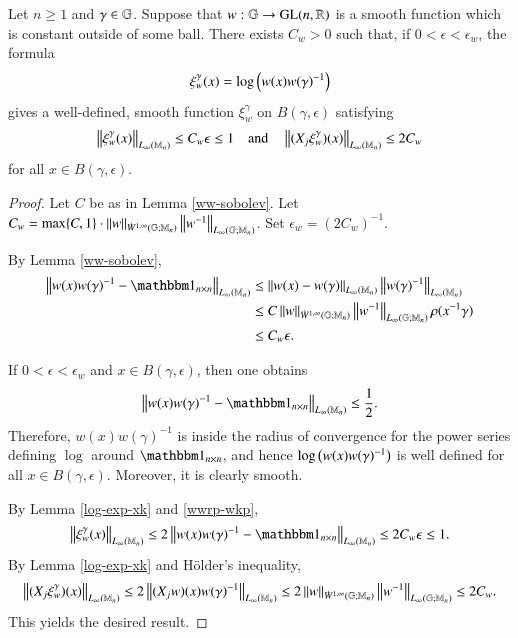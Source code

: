 \documentclass[leqno]{amsart}
\begin{document}
	
	
	
	
	\begin{lemma}\label{approximation-inner}
		Let $n\geq1$ and $\gamma\in\mathbb{G}$. Suppose that $w:\mathbb{G}\rightarrow{\rm GL}(n,\mathbb{R})$ is a smooth function which is constant outside of some ball. 		There exists $C_{w}>0$ such that, if $0<\epsilon<\epsilon_w$, the formula
		\begin{align*}
			\xi^{\gamma}_{w}(x)=\log\Big(w(x)w(\gamma)^{-1}\Big)
		\end{align*}
		gives a well-defined, smooth function $\xi^{\gamma}_{w}$ on $B(\gamma,\epsilon)$ satisfying
		\begin{align*}
			\left\| \xi^{\gamma}_{w}(x) \right\|_{L_{\infty}(\mathbb{M}_{n})}\leq C_{w}\epsilon\leq 1
			\quad\text{and}\quad
			\left\| (X_{j}\xi^{\gamma}_{w})(x) \right\|_{L_{\infty}(\mathbb{M}_{n})}\leq 2C_{w}
		\end{align*}
		for all $x\in B(\gamma, \epsilon)$.
	\end{lemma}
	\begin{proof} Let $C$ be as in Lemma \ref{ww-sobolev}. Let $C_{w}=\max\{C,1\}\cdot \left\| w \right\|_{\dot{W}^{1,\infty}(\mathbb{G};\mathbb{M}_{n})}\left\| w^{-1} \right\|_{L_{\infty}(\mathbb{G};\mathbb{M}_{n})}$. Set $\epsilon_w=(2C_w)^{-1}$.
		
		
		By Lemma \ref{ww-sobolev},
		\begin{align}\label{wwrp-wkp}
			\nonumber\Norm{w(x)w(\gamma)\rp-\unit_{n\times n}}_{\lm{n}}
			&\leq\Norm{w(x)-w(\gamma)}_{\lm{n}}\Norm{w(\gamma)\rp}_{\lm{n}}\\
			&\leq C\Norm{w}_{\wkp{\infty}}\Norm{w\rp}_{\lgm{n}}\rho(x\rp \gamma)\\
			\nonumber			&\leq C_w\epsilon.
		\end{align}
		
		If $0<\epsilon<\epsilon_w$ and $x\in B(\gamma,\epsilon)$, then one obtains
		\begin{align*}
			\Norm{w(x)w(\gamma)\rp-\unit_{n\times n}}_{\lm{n}}\leq\frac{1}{2}.
		\end{align*}
		Therefore, $w(x)w(\gamma)^{-1}$ is inside the radius of convergence for the power series defining $\log$ around $\unit_{n\times n}$, and hence $\log\big(w(x)w(\gamma)^{-1}\big)$ is well defined for all $x\in B(\gamma,\epsilon)$. Moreover, it is clearly smooth.
		
		By Lemma \ref{log-exp-xk} and \eqref{wwrp-wkp},
		\begin{align*}
			\Norm{\xi^{\gamma}_{w}(x)}_{\lm{n}}
			\leq2\Norm{w(x)w(\gamma)\rp-\unit_{n\times n}}_{\lm{n}}
			\leq 2C_{w}\epsilon\leq1.
		\end{align*}
		By Lemma \ref{log-exp-xk} and H\"{o}lder's inequality,
		\begin{align*}
			\left\| (X_{j}\xi^{\gamma}_{w})(x) \right\|_{L_{\infty}(\mathbb{M}_{n})}
			\leq2\left\| (X_{j}w)(x)w(\gamma)^{-1} \right\|_{L_{\infty}(\mathbb{M}_{n})}
			\leq2\left\| w \right\|_{\dot{W}^{1,\infty}(\mathbb{G};\mathbb{M}_{n})}\left\| w^{-1} \right\|_{L_{\infty}(\mathbb{G};\mathbb{M}_{n})}\leq 2C_w.
		\end{align*}
		This yields the desired result.
	\end{proof}
	
\end{document}
